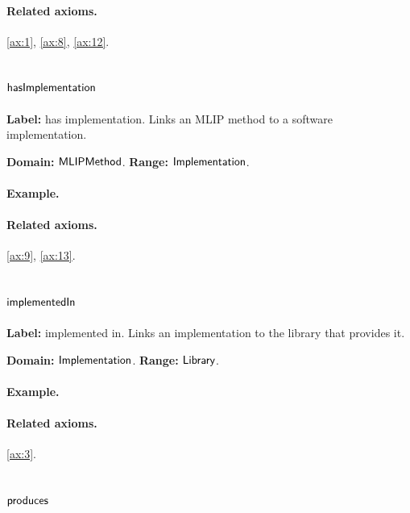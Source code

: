 \paragraph{Related axioms.} \eqref{ax:1}, \eqref{ax:8}, \eqref{ax:12}.

\subsection{$\mathsf{hasImplementation}$}
\label{sec:term-hasImplementation}

\textbf{Label:} has implementation.
Links an MLIP method to a software implementation.

\textbf{Domain:} $\mathsf{MLIPMethod}$.
\textbf{Range:} $\mathsf{Implementation}$.

\paragraph{Example.}

\paragraph{Related axioms.} \eqref{ax:9}, \eqref{ax:13}.

\subsection{$\mathsf{implementedIn}$}
\label{sec:term-implementedIn}

\textbf{Label:} implemented in.
Links an implementation to the library that provides it.

\textbf{Domain:} $\mathsf{Implementation}$.
\textbf{Range:} $\mathsf{Library}$.

\paragraph{Example.}

\paragraph{Related axioms.} \eqref{ax:3}.

\subsection{$\mathsf{produces}$}
\label{sec:term-produces}

